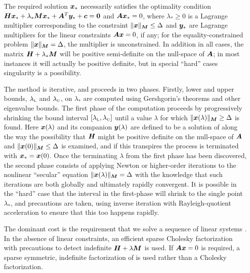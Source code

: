 \documentclass{galahad}
\begin{document}

\galmethod
The required solution ${\bm{x}}_*$ necessarily satisfies the optimality condition
${\bm{H}} {\bm{x}}_* + \lambda_* {\bm{M}} {\bm{x}}_* + {\bm{A}}^T {\bm{y}}_* + {\bm{c}} = {\bm{0}}$ and
${\bm{A}} {\bm{x}}_* = 0$, where $\lambda_* \geq 0$ is a Lagrange
multiplier corresponding to the constraint $\|{\bm{x}}\|_{{\bm{M}}}  \leq  \Delta$
and ${\bm{y}}_*$ are Lagrange multipliers for the linear constraints 
${\bm{A}} {\bm{x}} = 0$, if any;
for the equality-constrained problem $\|{\bm{x}}\|_{{\bm{M}}} = \Delta$,
the multiplier is unconstrained.
In addition in all cases, the matrix ${\bm{H}} + \lambda_* {\bm{M}}$ will be positive
semi-definite on the null-space of ${\bm{A}}$; in most instances it will actually
be positive definite, but in special ``hard'' cases singularity is a 
possibility.

\noindent
The method is iterative, and proceeds in two phases.
Firstly, lower and upper bounds, $\lambda_{\mbox{\protect\tiny L}}$ and
$\lambda_{\mbox{\protect\tiny U}}$, on $\lambda_*$ are computed
using Gershgorin's theorems and other eigenvalue bounds. The
first phase of the computation proceeds by progressively shrinking  the bound
interval $[\lambda_{\mbox{\protect\tiny L}},\lambda_{\mbox{\protect\tiny U}}]$
until a value $\lambda$ for which
$\|{\bm{x}}(\lambda)\|_{{\bm{M}}}  \geq  \Delta$ is found.
Here ${\bm{x}}(\lambda)$ and its companion ${\bm{y}}(\lambda)$
are defined to be a solution of
along the way the possibility that ${\bm{H}}$ might be positive definite on
the null-space of ${\bm{A}}$ and
$\|{\bm{x}}(0)\|_{{\bm{M}}}  \leq  \Delta$ is examined, and if this transpires
the process is terminated with ${\bm{x}}_* = {\bm{x}}(0)$.
Once the terminating $\lambda$ from the first phase has been discovered,
the second phase
consists of applying Newton or higher-order iterations to the nonlinear
``secular'' equation $\|{\bm{x}}(\lambda)\|_{{\bm{M}}}  =  \Delta$ with
the knowledge that such iterations are both globally and ultimately
rapidly convergent. It is possible in the ``hard'' case that the
interval in the first-phase will shrink to the single point $\lambda_*$,
and precautions are taken, using inverse iteration with Rayleigh-quotient
acceleration to ensure that this too happens rapidly.

The dominant cost is the requirement that we solve a sequence of linear systems
. In the absence of linear constraints, an
efficient sparse Cholesky factorization with precautions to
detect indefinite ${\bm{H}} + \lambda {\bm{M}}$ is used. If ${\bm{A}} {\bm{x}}  = 0$ is required,
a sparse symmetric, indefinite factorization of  is used
rather than a Cholesky factorization.
\end{document}
